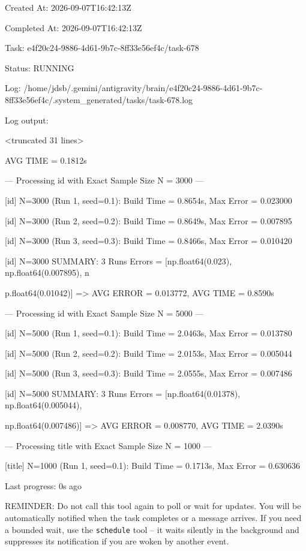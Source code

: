 \documentclass[11pt,a4paper]{article}
\begin{document}
Created At: 2026-09-07T16:42:13Z

Completed At: 2026-09-07T16:42:13Z

Task: e4f20c24-9886-4d61-9b7c-8ff33e56ef4c/task-678

Status: RUNNING

Log: /home/jdsb/.gemini/antigravity/brain/e4f20c24-9886-4d61-9b7c-8ff33e56ef4c/.system\_generated/tasks/task-678.log

Log output:

<truncated 31 lines>

AVG TIME = 0.1812s

--- Processing id with Exact Sample Size N = 3000 ---

[id] N=3000 (Run 1, seed=0.1): Build Time = 0.8654s, Max Error = 0.023000

[id] N=3000 (Run 2, seed=0.2): Build Time = 0.8649s, Max Error = 0.007895

[id] N=3000 (Run 3, seed=0.3): Build Time = 0.8466s, Max Error = 0.010420

[id] N=3000 SUMMARY: 3 Runs Errors = [np.float64(0.023), np.float64(0.007895), n

p.float64(0.01042)] => AVG ERROR = 0.013772, AVG TIME = 0.8590s

--- Processing id with Exact Sample Size N = 5000 ---

[id] N=5000 (Run 1, seed=0.1): Build Time = 2.0463s, Max Error = 0.013780

[id] N=5000 (Run 2, seed=0.2): Build Time = 2.0153s, Max Error = 0.005044

[id] N=5000 (Run 3, seed=0.3): Build Time = 2.0555s, Max Error = 0.007486

[id] N=5000 SUMMARY: 3 Runs Errors = [np.float64(0.01378), np.float64(0.005044),

np.float64(0.007486)] => AVG ERROR = 0.008770, AVG TIME = 2.0390s


--- Processing title with Exact Sample Size N = 1000 ---

[title] N=1000 (Run 1, seed=0.1): Build Time = 0.1713s, Max Error = 0.630636


Last progress: 0s ago



REMINDER: Do not call this tool again to poll or wait for updates. You will be automatically notified when the task completes or a message arrives. If you need a bounded wait, use the \texttt{schedule} tool -- it waits silently in the background and suppresses its notification if you are woken by another event.
\end{document}
